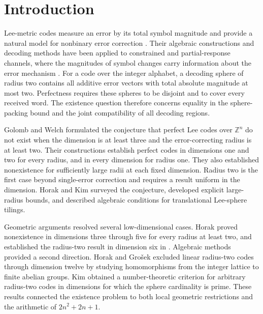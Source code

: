 \documentclass[12pt,letterpaper,onecolumn]{article}
\theoremstyle{definition}
\newcommand{\Z}{\mathbb{Z}}
\begin{document}
\section{Introduction}\label{sec:introduction}
Lee-metric codes measure an error by its total symbol magnitude and provide a natural model for nonbinary error correction \cite{Lee1958}. Their algebraic constructions and decoding methods have been applied to constrained and partial-response channels, where the magnitudes of symbol changes carry information about the error mechanism \cite{RothSiegel1994}. For a code over the integer alphabet, a decoding sphere of radius two contains all additive error vectors with total absolute magnitude at most two. Perfectness requires these spheres to be disjoint and to cover every received word. The existence question therefore concerns equality in the sphere-packing bound and the joint compatibility of all decoding regions.

Golomb and Welch \cite{GolombWelch1970} formulated the conjecture that perfect Lee codes over $\Z^n$ do not exist when the dimension is at least three and the error-correcting radius is at least two. Their constructions establish perfect codes in dimensions one and two for every radius, and in every dimension for radius one. They also established nonexistence for sufficiently large radii at each fixed dimension. Radius two is the first case beyond single-error correction and requires a result uniform in the dimension. Horak and Kim \cite{HorakKim2018} surveyed the conjecture, developed explicit large-radius bounds, and described algebraic conditions for translational Lee-sphere tilings.

Geometric arguments resolved several low-dimensional cases. Horak \cite{Horak2009Tilings} proved nonexistence in dimensions three through five for every radius at least two, and established the radius-two result in dimension six in \cite{Horak2009Perfect}. Algebraic methods provided a second direction. Horak and Gro\v{s}ek \cite{HorakGrosek2014} excluded linear radius-two codes through dimension twelve by studying homomorphisms from the integer lattice to finite abelian groups. Kim \cite{Kim2017} obtained a number-theoretic criterion for arbitrary radius-two codes in dimensions for which the sphere cardinality is prime. These results connected the existence problem to both local geometric restrictions and the arithmetic of $2n^2+2n+1$.
\end{document}
